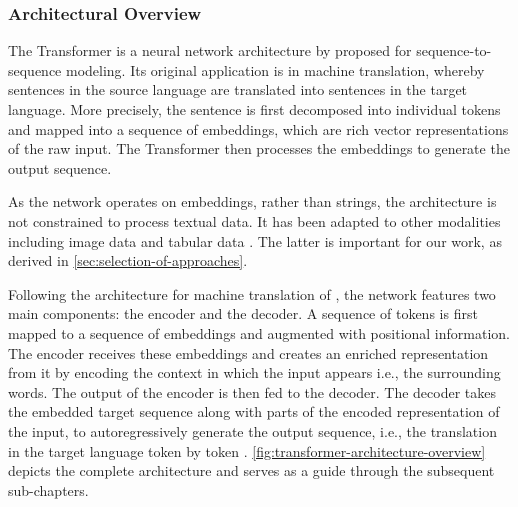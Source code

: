 \subsubsection{Architectural Overview}\label{sec:architectural-overview}

The Transformer is a neural network architecture by \textcite[][6002--6006]{vaswaniAttentionAllYou2017} proposed for sequence-to-sequence modeling. Its original application is in machine translation, whereby sentences in the source language are translated into sentences in the target language. More precisely, the sentence is first decomposed into individual \glspl{token} and mapped into a sequence of \glspl{embedding}, which are rich vector representations of the raw input. The Transformer then processes the \glspl{embedding} to generate the output sequence.

As the network operates on \glspl{embedding}, rather than strings, the architecture is not constrained to process textual data. It has been adapted to other modalities including image data \autocites[][4056--4059]{parmarImageTransformer2018}[][3]{dosovitskiyImageWorth16x162021} and tabular data \autocite[][18935--18936]{gorishniyRevisitingDeepLearning2021}. The latter is important for our work, as derived in \cref{sec:selection-of-approaches}.

Following the architecture for machine translation of \textcite[][3106]{sutskeverSequenceSequenceLearning2014}, the network features two main components: the encoder and the decoder. A sequence of \glspl{token} is first mapped to a sequence of \glspl{embedding} and augmented with positional information. The encoder receives these \glspl{embedding} and creates an enriched representation from it by encoding the context in which the input appears i.e., the surrounding words. The output of the encoder is then fed to the decoder. The decoder takes the embedded target sequence along with parts of the encoded representation of the input, to autoregressively generate the output sequence, i.e., the translation in the target language \gls{token} by \gls{token} \autocite[][6003]{vaswaniAttentionAllYou2017}. \cref{fig:transformer-architecture-overview} depicts the complete architecture and serves as a guide through the subsequent sub-chapters.

